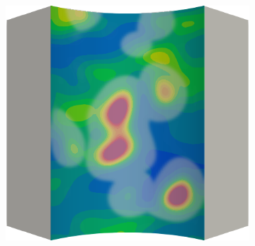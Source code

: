 \begin{figure}[!htbp]
\begin{subfigure}{0.19\textwidth}
  \end{subfigure}
  \hspace{0.06\textwidth}
  \begin{subfigure}{0.19\textwidth}
    \centering
    \includegraphics[width=\textwidth]{Chapter5/figures/spallation/ep.0024}
  \end{subfigure}
  

\end{figure}
